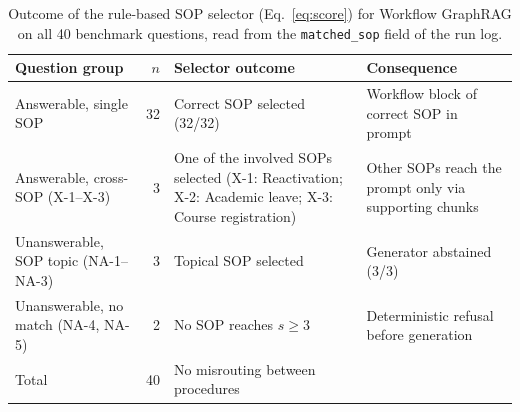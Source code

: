 \begin{table}[!htbp]
\centering
\caption{Outcome of the rule-based SOP selector (Eq.~\eqref{eq:score}) for Workflow GraphRAG on all 40 benchmark questions, read from the \texttt{matched\_sop} field of the run log.}
\label{tab:selection}
\small
\setlength{\tabcolsep}{4pt}
\begin{tabularx}{\textwidth}{>{\raggedright\arraybackslash}p{3.6cm} r >{\raggedright\arraybackslash}X >{\raggedright\arraybackslash}p{3.4cm}}
\toprule
Question group & $n$ & Selector outcome & Consequence \\
\midrule
Answerable, single SOP & 32 & Correct SOP selected (32/32) & Workflow block of correct SOP in prompt \\
Answerable, cross-SOP (X-1--X-3) & 3 & One of the involved SOPs selected (X-1: Reactivation; X-2: Academic leave; X-3: Course registration) & Other SOPs reach the prompt only via supporting chunks \\
Unanswerable, SOP topic (NA-1--NA-3) & 3 & Topical SOP selected & Generator abstained (3/3) \\
Unanswerable, no match (NA-4, NA-5) & 2 & No SOP reaches $s \geq 3$ & Deterministic refusal before generation \\
\midrule
Total & 40 & No misrouting between procedures & \\
\bottomrule
\end{tabularx}
\end{table}

